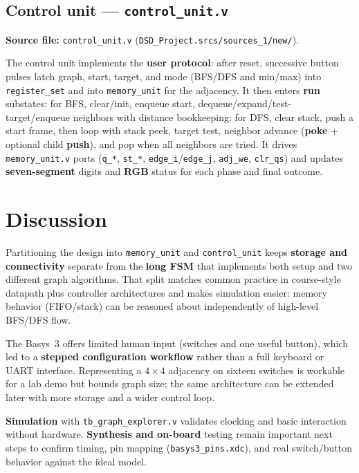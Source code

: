\documentclass[11pt,a4paper]{article}
\newcommand{\srcpath}{\texttt{DSD\_Project.srcs/sources\_1/new/}}
\begin{document}
\subsection{Control unit — \texttt{control\_unit.v}}
\textbf{Source file:} \texttt{control\_unit.v} (\srcpath).

The control unit implements the \textbf{user protocol}: after reset, successive button pulses latch graph, start, target, and mode (BFS/DFS and min/max) into \texttt{register\_set} and into \texttt{memory\_unit} for the adjacency. It then enters \textbf{run} substates: for BFS, clear/init, enqueue start, dequeue/expand/test-target/enqueue neighbors with distance bookkeeping; for DFS, clear stack, push a start frame, then loop with stack peek, target test, neighbor advance (\textbf{poke} + optional child \textbf{push}), and pop when all neighbors are tried. It drives \texttt{memory\_unit.v} ports (\texttt{q\_*}, \texttt{st\_*}, \texttt{edge\_i}/\texttt{edge\_j}, \texttt{adj\_we}, \texttt{clr\_qs}) and updates \textbf{seven-segment} digits and \textbf{RGB} status for each phase and final outcome.

\section{Discussion}

Partitioning the design into \texttt{memory\_unit} and \texttt{control\_unit} keeps \textbf{storage and connectivity} separate from the \textbf{long FSM} that implements both setup and two different graph algorithms. That split matches common practice in course-style datapath plus controller architectures and makes simulation easier: memory behavior (FIFO/stack) can be reasoned about independently of high-level BFS/DFS flow.

The Basys~3 offers limited human input (switches and one useful button), which led to a \textbf{stepped configuration workflow} rather than a full keyboard or UART interface. Representing a $4\times4$ adjacency on sixteen switches is workable for a lab demo but bounds graph size; the same architecture can be extended later with more storage and a wider control loop.

\textbf{Simulation} with \texttt{tb\_graph\_explorer.v} validates clocking and basic interaction without hardware. \textbf{Synthesis and on-board} testing remain important next steps to confirm timing, pin mapping (\texttt{basys3\_pins.xdc}), and real switch/button behavior against the ideal model.
\end{document}
